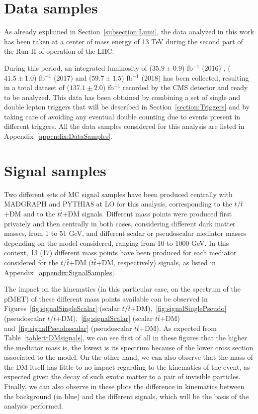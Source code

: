 \documentclass[a4paper, 10pt, openright]{report}
\begin{document}
\section{Data samples} \label{section:Data}

As already explained in Section~\ref{subsection:Lumi}, the data analyzed in this work has been taken at a center of mass energy of 13 TeV during the second part of the Run II of operation of the \ac{LHC}. 

During this period, an integrated luminosity of ($35.9 \pm 0.9$) fb$^{-1}$ (2016) \cite{Lumi2016}, ($41.5 \pm 1.0$) fb$^{-1}$ (2017) \cite{Lumi2017} and ($59.7 \pm 1.5$) fb$^{-1}$ (2018) \cite{Lumi2018} has been collected, resulting in a total dataset of ($137.1 \pm 2.0$) fb$^{-1}$ recorded by the \ac{CMS} detector and ready to be analyzed. This data has been obtained by combining a set of single and double lepton triggers that will be described in Section~\ref{section:Triggers} and by taking care of avoiding any eventual double counting due to events present in different triggers. All the data samples considered for this analysis are listed in Appendix~\ref{appendix:DataSamples}.

\section{Signal samples} \label{section:Signals}

Two different sets of \ac{MC} signal samples have been produced centrally with MADGRAPH and PYTHIA8 at \ac{LO} for this analysis, corresponding to the $t/\bar t$+DM and to the $t \bar t$+DM signals. Different mass points were produced first privately and then centrally in both cases, considering different dark matter masses, from 1 to 51 GeV, and different scalar or pseudoscalar mediator masses depending on the model considered, ranging from 10 to 1000 GeV. In this context, 13 (17) different mass points have been produced for each mediator considered for the $t/\bar t$+DM ($t \bar t$+DM, respectively) signals, as listed in Appendix~\ref{appendix:SignalSamples}.

The impact on the kinematics (in this particular case, on the spectrum of the pf\ac{MET}) of these different mass points available can be observed in Figures~\ref{fig:signalSingleScalar} (scalar $t/\bar t$+DM),~\ref{fig:signalSinglePseudo} (pseudoscalar $t/\bar t$+DM),~\ref{fig:signalScalar} (scalar $t \bar t$+DM) and~\ref{fig:signalPseudoscalar} (pseudoscalar $t \bar t$+DM). As expected from Table~\ref{table:ttDMsignals}, we can see first of all in these figures that the higher the mediator mass is, the lowest is its spectrum because of the lower cross section associated to the model. On the other hand, we can also observe that the mass of the \ac{DM} itself has little to no impact regarding to the kinematics of the event, as expected given the decay of such exotic matter to a pair of invisible particles. Finally, we can also observe in these plots the difference in kinematics between the background (in blue) and the different signals, which will be the basis of the analysis performed.
\end{document}
